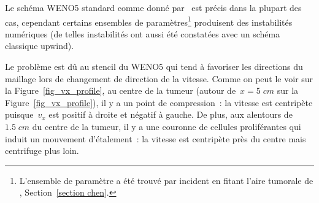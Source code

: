 \documentclass[main.tex]{subfiles}
\begin{document}

Le schéma WENO5 standard comme donné par~\cite{Liu1994} est précis dans la plupart des cas, cependant certains ensembles de paramètres\footnote{L'ensemble de paramètre a été trouvé par incident en  fitant l'aire tumorale de \Chen, \cf Section~\ref{section chen}.} produisent des instabilités numériques (de telles instabilités ont aussi été constatées avec un schéma classique upwind). 


Le problème est dû au stencil du WENO5 qui tend à favoriser les directions du maillage lors de changement de direction de la vitesse.
Comme on peut le voir sur la Figure~\ref{fig_vx_profile}, 
au centre de la tumeur (autour de~$x=5\;cm$ sur la  Figure~\ref{fig_vx_profile}), il y a un point de compression~: 
la vitesse est centripète puisque~$v_x$ est positif à droite et négatif à gauche. 
De plus, aux alentours de~$1.5\;cm$ du centre de la tumeur, il y a une couronne de cellules proliférantes qui induit un mouvement d'étalement~: la vitesse est centripète près du centre mais centrifuge plus loin. 
\end{document}
